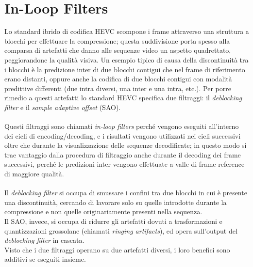 \section{In-Loop Filters}
Lo standard ibrido di codifica HEVC scompone i frame attraverso una struttura a 
blocchi per effettuare la compressione; questa suddivisione porta spesso alla 
comparsa di artefatti che danno alle sequenze video un aspetto quadrettato, 
peggiorandone la qualità visiva. Un esempio tipico di causa della discontinuità 
tra i blocchi è la predizione inter di due blocchi contigui che nel frame
 di riferimento erano distanti, oppure anche la codifica di due blocchi contigui
 con modalità predittive differenti (due intra diversi, una inter e una intra, 
etc.). Per porre rimedio a questi artefatti lo standard HEVC specifica due 
filtraggi: il \emph{deblocking filter} e il \emph{sample adaptive offset} (SAO).
\\ \\
Questi filtraggi sono chiamati \emph{in-loop filters} perché vengono eseguiti 
all'interno dei cicli di encoding/decoding, e i risultati vengono utilizzati 
nei cicli successivi oltre che durante la visualizzazione delle sequenze 
decodificate; in questo modo si trae vantaggio dalla procedura di filtraggio 
anche durante
 il decoding dei frame successivi, perché le predizioni inter vengono effettuate
 a valle di frame reference di maggiore qualità.
\\ \\
Il \emph{deblocking filter} si occupa di smussare i confini tra due blocchi in 
cui è presente una discontinuità, cercando di lavorare solo su quelle 
introdotte durante la compressione e non quelle originariamente presenti nella 
sequenza. \\
Il SAO, invece, si occupa di ridurre gli artefatti dovuti a trasformazioni e 
quantizzazioni grossolane (chiamati \emph{ringing artifacts}), ed opera 
sull'output del \emph{deblocking filter} in cascata. \\
Visto che i due filtraggi operano su due artefatti diversi, i loro benefici 
sono additivi se eseguiti insieme.


